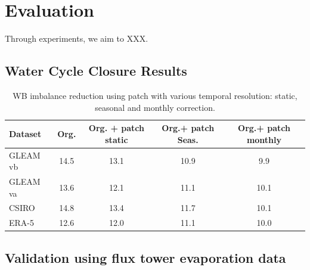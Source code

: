 \documentclass[draft]{agujournal2019}
\begin{document}
\section{Evaluation}

Through experiments, we aim to XXX.

\subsection{Water Cycle Closure Results}

\begin{table}[h]
\centering
\begin{scriptsize}
\begin{tabular} {l c c c c}
\hline
Dataset & Org. &   Org. + patch static &  Org.+ patch Seas. &  Org.+ patch monthly \\
\hline 
GLEAM vb &  14.5   &   13.1    &  10.9    &  9.9   \\
GLEAM va &  13.6   &   12.1    &  11.1    &  10.1  \\
CSIRO    &  14.8   &   13.4    &  11.7    &  10.1  \\
ERA-5    &  12.6   &   12.0    &  11.1    &  10.0  \\
\hline
\end{tabular}
\end{scriptsize}
\caption{WB imbalance reduction using patch with various temporal resolution: static, seasonal and monthly correction. }
\label{table1}
\end{table}

\subsection{Validation using flux tower evaporation data}
\end{document}
